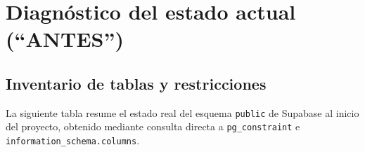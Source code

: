 
\section{Diagnóstico del estado actual (``ANTES'')}

\subsection{Inventario de tablas y restricciones}

La siguiente tabla resume el estado real del esquema \texttt{public} de Supabase al inicio del proyecto, obtenido mediante consulta directa a \texttt{pg\_constraint} e \texttt{information\_schema.columns}.

